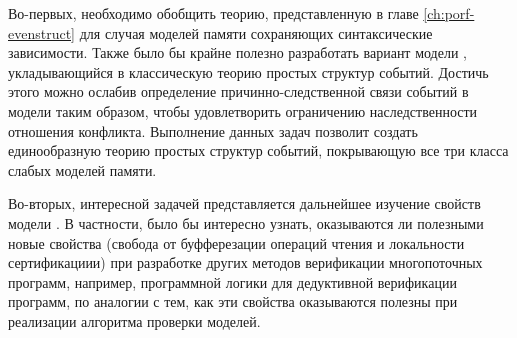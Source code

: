 Во-первых, необходимо обобщить теорию, представленную в главе \ref{ch:porf-evenstruct}
для случая моделей памяти сохраняющих синтаксические зависимости.
Также было бы крайне полезно разработать вариант модели \Wkm,
укладывающийся в классическую теорию простых структур событий. 
Достичь этого можно ослабив определение причинно-следственной связи
событий в модели \Wkm таким образом, чтобы удовлетворить
ограничению наследственности отношения конфликта.
Выполнение данных задач позволит создать единообразную
теорию простых структур событий, покрывающую
все три класса слабых моделей памяти.

Во-вторых, интересной задачей представляется
дальнейшее изучение свойств модели \WkmS.
В частности, было бы интересно узнать,
оказываются ли полезными новые свойства \WkmS
(свобода от буфферезации операций чтения и локальности сертификациии)
при разработке других методов верификации многопоточных программ,
например, программной логики для дедуктивной верификации программ,
по аналогии с тем, как эти свойства оказываются полезны
при реализации алгоритма проверки моделей. 


